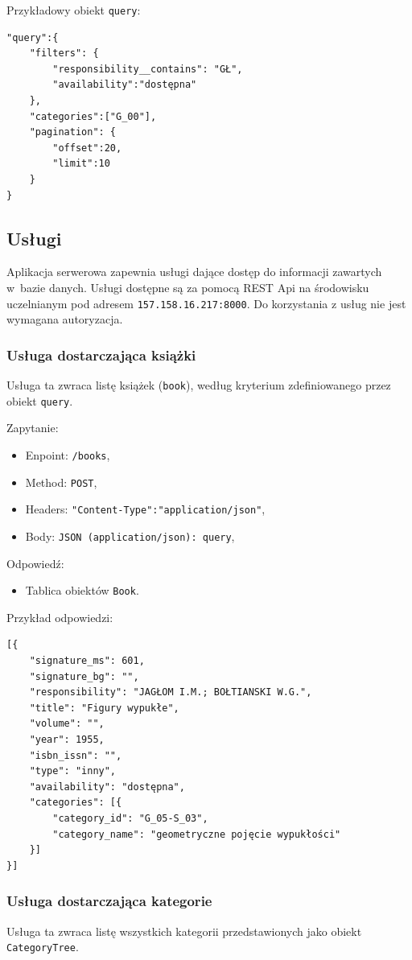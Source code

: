 \documentclass[twoside]{projektInzynierskiMS}
\begin{document}
Przykładowy obiekt \verb`query`:

\begin{verbatim}
"query":{
    "filters": {
        "responsibility__contains": "GŁ",
        "availability":"dostępna"
    },
    "categories":["G_00"],
    "pagination": {
        "offset":20,
        "limit":10
    }
}
\end{verbatim}

\subsection{Usługi}
Aplikacja serwerowa zapewnia usługi dające dostęp do informacji zawartych w~bazie danych. Usługi dostępne są za pomocą REST Api na środowisku uczelnianym pod adresem \verb`157.158.16.217:8000`. Do korzystania z usług nie jest wymagana autoryzacja.

\subsubsection{Usługa dostarczająca książki}
Usługa ta zwraca listę książek (\verb`book`), według kryterium zdefiniowanego przez obiekt \verb`query`.

Zapytanie:
\begin{itemize}
	\item Enpoint: \verb`/books`,
	\item Method: \verb`POST`,
	\item Headers: \verb`"Content-Type":"application/json"`,
	\item Body: \verb`JSON (application/json): query`,
\end{itemize}

Odpowiedź:
\begin{itemize}
	\item Tablica obiektów \verb`Book`.
\end{itemize}

Przykład odpowiedzi:
\begin{verbatim}
[{
    "signature_ms": 601,
    "signature_bg": "",
    "responsibility": "JAGŁOM I.M.; BOŁTIANSKI W.G.",
    "title": "Figury wypukłe",
    "volume": "",
    "year": 1955,
    "isbn_issn": "",
    "type": "inny",
    "availability": "dostępna",
    "categories": [{
        "category_id": "G_05-S_03",
        "category_name": "geometryczne pojęcie wypukłości"
    }]
}]
\end{verbatim}

\subsubsection{Usługa dostarczająca kategorie}
Usługa ta zwraca listę wszystkich kategorii przedstawionych jako obiekt \verb`CategoryTree`. 
\end{document}
